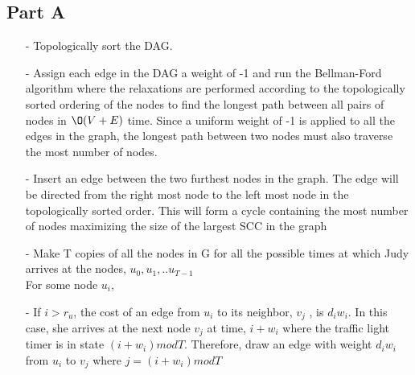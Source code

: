 \documentclass[12pt,twoside]{article}
\begin{document}

\begin{problems}

\section*{Part A}

\problem  %

\begin{itemize}
	\item[-] Topologically sort the DAG.
	\item [-] Assign each edge in the DAG a weight of -1 and run the Bellman-Ford algorithm where the relaxations are performed according to the topologically sorted ordering of the nodes to find the longest path between all pairs of nodes in $\O (V +E)$ time. Since a uniform weight of -1 is applied to all the edges in the graph, the longest path between two nodes must also traverse the most number of nodes.
	\item[-] Insert an edge between the two furthest nodes in the graph. The edge will be directed from the right most node to the left most node in the topologically sorted order. This will form a cycle containing the most number of nodes maximizing the size of the largest SCC in the graph
\end{itemize}

\problem  

\begin{itemize}
	\item[-] Make T copies of all the nodes in G for all the possible times at which Judy arrives at the nodes, $u_0, u_1, ..u_{T-1}$\\
	
	For some node $u_i$, 
	
	\item[-]If $i > r_u$, the cost of an edge from $u_i$ to its neighbor, $v_j$ , is $d_iw_i$. In this case, she arrives at the next node $v_j$ at time, $i+w_i$ where the traffic light timer is in state $(i+w_i) mod T$. Therefore, draw an edge with weight $d_iw_i$  from $u_i$ to $v_j$ where $j=(i+w_i) mod T$ 
	

\end{itemize}
\end{problems}
\end{document}
